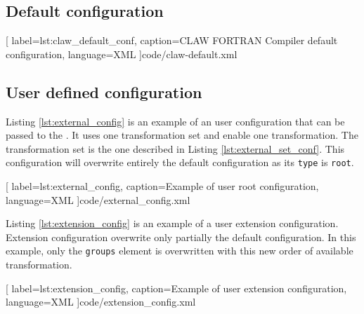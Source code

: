 \subsection{Default configuration}

  [
    label=lst:claw_default_conf,
    caption=CLAW FORTRAN Compiler default configuration,
    language=XML
  ]{code/claw-default.xml}

\subsection{User defined configuration}
Listing \ref{lst:external_config} is an example of an user configuration that
can be passed to the \clawfcomp. It uses one transformation set and enable
one transformation. The transformation set is the one described in Listing 
\ref{lst:external_set_conf}. This configuration will overwrite entirely the
default configuration as its \lstinline!type! is \lstinline!root!.


  [
    label=lst:external_config,
    caption=Example of user root configuration,
    language=XML
  ]{code/external_config.xml}

Listing \ref{lst:extension_config} is an example of a user extension configuration.
Extension configuration overwrite only partially the default configuration. In this
example, only the \lstinline!groups! element is overwritten with this new order of
available transformation.


  [
    label=lst:extension_config,
    caption=Example of user extension configuration,
    language=XML
  ]{code/extension_config.xml}